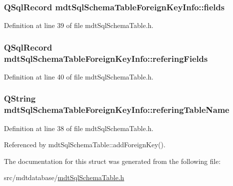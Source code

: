 \hypertarget{structmdt_sql_schema_table_foreign_key_info_a889196c9a4cb8c89722de9f03fa6daae}{
\subsubsection[{fields}]{\setlength{\rightskip}{0pt plus 5cm}Q\-Sql\-Record mdt\-Sql\-Schema\-Table\-Foreign\-Key\-Info\-::fields}}\label{structmdt_sql_schema_table_foreign_key_info_a889196c9a4cb8c89722de9f03fa6daae}


Definition at line 39 of file mdt\-Sql\-Schema\-Table.\-h.

\hypertarget{structmdt_sql_schema_table_foreign_key_info_a23be89174f7131ce33047b11da180504}{
\subsubsection[{refering\-Fields}]{\setlength{\rightskip}{0pt plus 5cm}Q\-Sql\-Record mdt\-Sql\-Schema\-Table\-Foreign\-Key\-Info\-::refering\-Fields}}\label{structmdt_sql_schema_table_foreign_key_info_a23be89174f7131ce33047b11da180504}


Definition at line 40 of file mdt\-Sql\-Schema\-Table.\-h.

\hypertarget{structmdt_sql_schema_table_foreign_key_info_a67a54a858ca960ed0da71f734bb222b1}{
\subsubsection[{refering\-Table\-Name}]{\setlength{\rightskip}{0pt plus 5cm}Q\-String mdt\-Sql\-Schema\-Table\-Foreign\-Key\-Info\-::refering\-Table\-Name}}\label{structmdt_sql_schema_table_foreign_key_info_a67a54a858ca960ed0da71f734bb222b1}


Definition at line 38 of file mdt\-Sql\-Schema\-Table.\-h.



Referenced by mdt\-Sql\-Schema\-Table\-::add\-Foreign\-Key().



The documentation for this struct was generated from the following file\-:\begin{DoxyCompactItemize}
\item 
src/mdtdatabase/\hyperlink{mdt_sql_schema_table_8h}{mdt\-Sql\-Schema\-Table.\-h}\end{DoxyCompactItemize}
